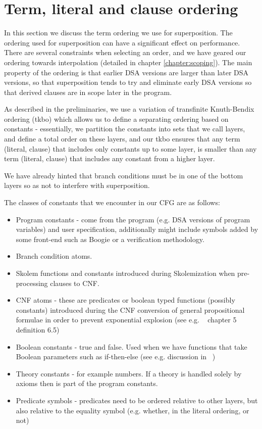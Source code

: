
\newpage

\section{Term, literal and clause ordering}\label{section:gfole:ordering}
In this section we discuss the term ordering we use for superposition. The ordering used for superposition can have a significant effect on performance. There are several constraints when selecting an order, and we have geared our ordering towards interpolation (detailed in chapter \ref{chapter:scoping}). The main property of the ordering is that earlier DSA versions are larger than later DSA versions, so that superposition tends to try and eliminate early DSA versions so that derived clauses are in scope later in the program.

As described in the preliminaries, we use a variation of transfinite Knuth-Bendix ordering (tkbo) which allows us to define a separating ordering based on constants - essentially, we partition the constants into sets that we call layers, and define a total order on these layers, and our tkbo ensures that any term (literal, clause) that includes only constants up to some layer, is smaller than any term (literal, clause) that includes any constant from a higher layer.

We have already hinted that branch conditions must be in one of the bottom layers so as not to interfere with superposition.

The classes of constants that we encounter in our CFG are as follows:
\begin{itemize}
	\item Program constants - come from the program (e.g. DSA versions of program variables) and user specification, additionally might include symbols added by some front-end such as Boogie or a verification methodology.
	\item Branch condition atoms.
	\item Skolem functions and constants introduced during Skolemization when pre-processing clauses to CNF.
	\item CNF atoms - these are predicates or boolean typed functions (possibly constants) introduced during the CNF conversion of general propositional formulae in order to prevent exponential explosion (see e.g. ~\cite{RobinsonVoronkov2001} chapter 5 definition 6.5)
	\item Boolean constants - true and false. Used when we have functions that take Boolean parameters such as if-then-else (see e.g. discussion in ~\cite{RegerSudaVoronkov15})
	\item Theory constants - for example numbers. If a theory is handled solely by axioms then is part of the program constants.
	\item Predicate symbols - predicates need to be ordered relative to other layers, but also relative to the equality symbol (e.g. 
	whether, in the literal ordering,  or not)
\end{itemize}

